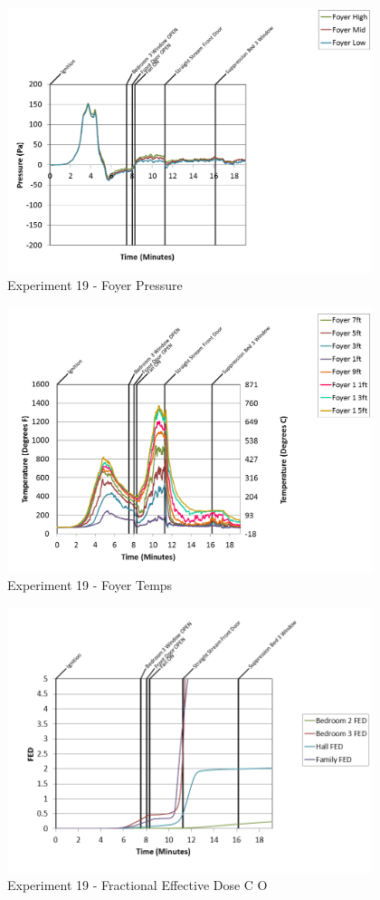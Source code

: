 \documentclass{article}
\begin{document}
\begin{appendices}
\begin{figure}[h!]
	\centering
	\includegraphics[height=3.05in]{0_Images/Results_Charts/Exp_19_Charts/FoyerPressure.png}
	\caption{Experiment 19 - Foyer Pressure}
\end{figure}

\clearpage

\begin{figure}[h!]
	\centering
	\includegraphics[height=3.05in]{0_Images/Results_Charts/Exp_19_Charts/FoyerTemps.png}
	\caption{Experiment 19 - Foyer Temps}
\end{figure}


\begin{figure}[h!]
	\centering
	\includegraphics[height=3.05in]{0_Images/Results_Charts/Exp_19_Charts/FractionalEffectiveDoseCO.png}
	\caption{Experiment 19 - Fractional Effective Dose C O}
\end{figure}


\end{appendices}
\end{document}
